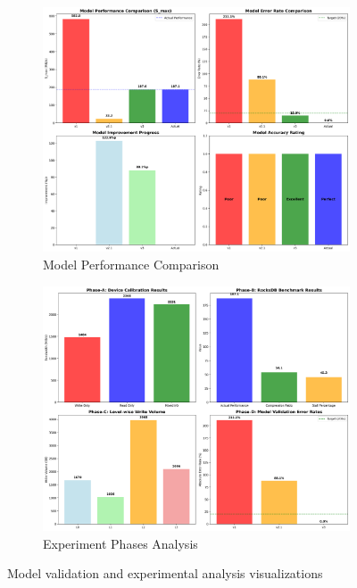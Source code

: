 \documentclass[11pt]{article}
\begin{document}
\begin{figure}[H]
\centering
\begin{subfigure}{0.48\textwidth}
\centering
\includegraphics[width=\textwidth]{experiments/2025-09-05/model_comparison_visualization.png}
\caption{Model Performance Comparison}
\label{fig:model_comparison}
\end{subfigure}
\hfill
\begin{subfigure}{0.48\textwidth}
\centering
\includegraphics[width=\textwidth]{experiments/2025-09-05/experiment_phases_visualization.png}
\caption{Experiment Phases Analysis}
\label{fig:experiment_phases}
\end{subfigure}
\caption{Model validation and experimental analysis visualizations}
\end{figure}
\end{document}
